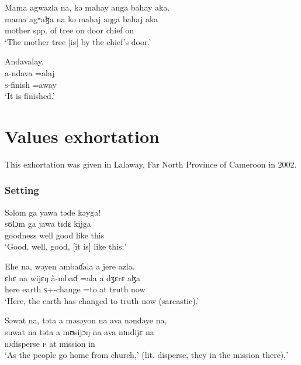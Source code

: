 \ea  Mama  agwazla  na,  kə  mahay  anga  bahay  aka.\\
 \gll mama  agʷaɮa   na  kə  mahaj  aŋga  bahaj  aka\\
 mother  {spp. of tree}       {\PSP}  on     door  {\POSS}  chief  on\\
 \glt ‘The mother tree [is] by the chief's door.’
 \z

\ea  Andavalay.\\
 \gll a-ndava  =alaj\\ 
 \textsc{s}-finish    =away\\
 \glt ‘It is finished.’
\z

\clearpage
 \section[Values exhortation]{Values exhortation \\\hspace{1.5em} \textnormal{}}\setcounter{equation}{0}\label{sec:1.7}
 \hypertarget{RefHeading1210381525720847}{}
 This exhortation was given in Lalaway, Far North Province of Cameroon in 2002.  
 
 \subsubsection*{Setting}
\ea Səlom  ga  yawa  təde  kəyga!\\
 \gll sʊlɔm  ga  jawa   tɪdɛ   kijga\\
 goodness  {\ADJ}  well  good  {like this}\\
 \glt ‘Good, well, good, [it is] like this:’
 \z

\ea Ehe  na,  wəyen  ambaɗala  a  jere  azla.\\
 \gll ɛhɛ     na wijɛŋ   à-mbaɗ    =ala   a   dʒɛrɛ   aɮa\\
 here    {\PSP}  earth  \textsc{s}+{\PFV}-change  =to  at  truth  now\\
 \glt ‘Here, the earth has changed to truth now (sarcastic).’
 \z

\ea Səwat  na,   təta  a  məsəyon  na  ava  nəndəye  na,\\  
 \gll suwat  na təta  a  mʊsijɔŋ   na   ava  nɪndijɛ  na\\
 \textsc{id}disperse  {\PSP}  \textsc{p}      at   mission  {\PSP}  in  {\DEM}  {\PSP}  \\
 \glt ‘As the people go home from church,’ (lit. disperse, they in the mission there),’ \\
 
